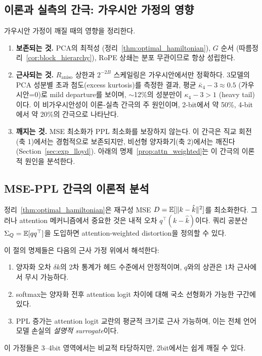 \subsection{이론과 실측의 간극: 가우시안 가정의 영향}
\label{sec:theory_gap}

가우시안 가정이 깨질 때의 영향을 정리한다.

\begin{enumerate}[leftmargin=1.5em,itemsep=2pt]
\item \textbf{보존되는 것.} PCA의 최적성 (정리~\ref{thm:optimal_hamiltonian}), $G$ 순서 (따름정리~\ref{cor:block_hierarchy}), RoPE 상쇄는 분포 무관이므로 항상 성립한다.
\item \textbf{근사되는 것.} $R_{\mathrm{aniso}}$ 상한과 $2^{-2B}$ 스케일링은 가우시안에서만 정확하다. 3모델의 PCA 성분별 초과 첨도(excess kurtosis)를 측정한 결과, 평균 $\bar{\kappa}_4 - 3 \approx 0.5$ (가우시안=0)로 mild departure를 보이며, $\sim$12\%의 성분만이 $\kappa_4 - 3 > 1$ (heavy tail)이다. 이 비가우시안성이 이론-실측 간극의 주 원인이며, 2-bit에서 약 50\%, 4-bit에서 약 20\%의 간극으로 나타난다.
\item \textbf{깨지는 것.} MSE 최소화가 PPL 최소화를 보장하지 않는다. 이 간극은 직교 회전(축 1)에서는 경험적으로 보존되지만, 비선형 양자화기(축 2)에서는 깨진다 (Section~\ref{sec:exp_lloyd}). 아래의 명제~\ref{prop:attn_weighted}는 이 간극의 이론적 원인을 분석한다.
\end{enumerate}

\subsection{MSE-PPL 간극의 이론적 분석}
\label{sec:attn_weighted}

정리~\ref{thm:optimal_hamiltonian}은 재구성 MSE $D = \mathbb{E}[\lVert k - \hat{k} \rVert^2]$를 최소화한다. 그러나 attention 메커니즘에서 중요한 것은 내적 오차 $q^\top (k - \hat{k})$이다. 쿼리 공분산 $\Sigma_Q = \mathbb{E}[qq^\top]$을 도입하면 attention-weighted distortion을 정의할 수 있다.

\begin{assumption}
\label{ass:attn_surrogate}
이 절의 명제들은 다음의 근사 가정 위에서 해석한다:
\begin{enumerate}[leftmargin=1.5em,itemsep=2pt]
\item 양자화 오차 $\delta k$의 2차 통계가 헤드 수준에서 안정적이며, $q$와의 상관은 1차 근사에서 무시 가능하다.
\item softmax는 양자화 전후 attention logit 차이에 대해 국소 선형화가 가능한 구간에 있다.
\item PPL 증가는 attention logit 교란의 평균적 크기로 근사 가능하며, 이는 전체 언어모델 손실의 \emph{설명적 surrogate}이다.
\end{enumerate}
이 가정들은 3--4bit 영역에서는 비교적 타당하지만, 2bit에서는 쉽게 깨질 수 있다.
\end{assumption}

